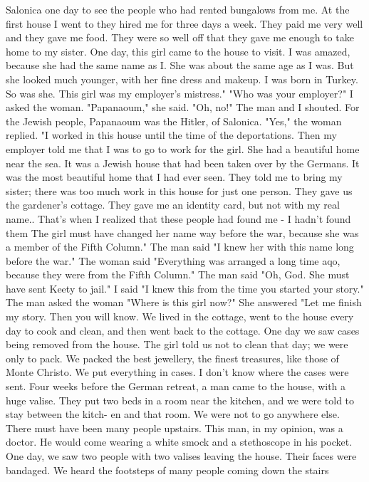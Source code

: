 Salonica one day to see the people who had rented bungalows from me. At the first house 
I went to they hired me for three days a week. They paid me very well and they gave me 
food. They were so well off that they gave me enough to take home to my sister. 
One day, this girl came to the house to visit. I was amazed, because she had the 
same name as I. She was about the same age as I was. But she looked much younger, with her fine dress and makeup. I was born in Turkey. So was she. This girl was 
my employer's mistress." 
"Who was your employer?" I asked the woman. 
"Papanaoum," she said. 
"Oh, no!" The man and I shouted. For the Jewish people, Papanaoum was the Hitler, 
of Salonica. 
"Yes," the woman replied. "I worked in this house until the time of the deportations. Then my employer told me that I was to go to work for the girl. She had a beautiful home near the sea. It was a Jewish house that had been taken over by the Germans. 
It was the most beautiful home that I had ever seen. They told me to bring my sister; 
there was too much work in this house for just one person. 
They gave us the gardener's cottage. They gave me an identity card, but not with my real name.. That's when I realized that these people had found me - I hadn't found them 
The girl must have changed her name way before the war, because she was a member of the 
Fifth Column." 
The man said "I knew her with this name long before the war." 
The woman said "Everything was arranged a long time aqo, because they were from the Fifth Column." The man said "Oh, God. She must have sent Keety to jail." 
I said "I knew this from the time you started your story." 
The man asked the woman "Where is this girl now?" 
She answered "Let me finish my story. Then you will know. We lived in the cottage, 
went to the house every day to cook and clean, and then went back to the cottage. One day 
we saw cases being removed from the house. The girl told us not to clean that day; we 
were only to pack. We packed the best jewellery, the finest treasures, like those of 
Monte Christo. We put everything in cases. I don't know where the cases were sent. 
Four weeks before the German retreat, a man came to the house, with a huge valise. 
They put two beds in a room near the kitchen, and we were told to stay between the kitch-
en and that room. We were not to go anywhere else. There must have been many people 
upstairs. 
This man, in my opinion, was a doctor. He would come wearing a white smock and a 
stethoscope in his pocket. One day, we saw two people with two valises leaving the house. 
Their faces were bandaged. We heard the footsteps of many people coming down the stairs 
